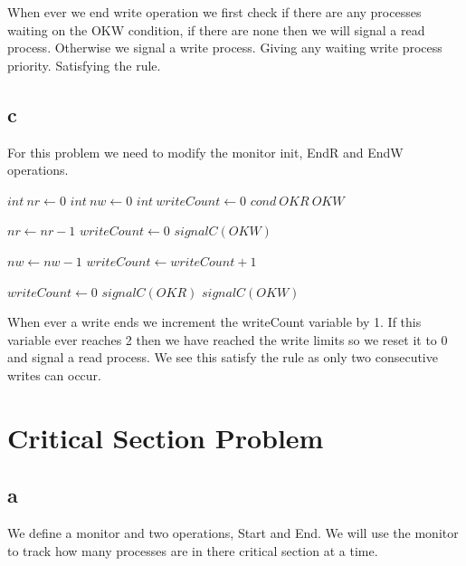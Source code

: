 \documentclass[a4paper, 12pt]{article}
\begin{document}
  		When ever we end write operation we first check if there are any processes waiting on the OKW condition, if there are none then we will signal a read process. Otherwise we signal a write process. Giving any waiting write process priority. Satisfying the rule.
  		
  	\subsection{c}
  		For this problem we need to modify the monitor init, EndR and EndW operations.
  		
		 \begin{algorithm}[H]
  			\begin{algorithmic}[1]
  					\State $int\ nr \gets 0$
  					\State $int\ nw \gets 0$
  					\State $int\ writeCount \gets 0$
  					\State $cond\ OKR\ OKW$
  				\EndProcedure
  				
					\State $nr \gets nr - 1$
					\State $writeCount \gets 0$
						\State $signalC(OKW)$
					\EndIf
				\EndProcedure  				
  				
  					\State $nw \gets nw - 1$
  					\State $writeCount \gets writeCount + 1$
  					
  						\State $writeCount \gets 0$
  						\State $signalC(OKR)$
  					\Else
  						\State $signalC(OKW)$
  					\EndIf
  				\EndProcedure
  			\end{algorithmic}
  		\end{algorithm}
  		
		When ever a write ends we increment the writeCount variable by 1. If this variable ever reaches 2 then we have reached the write limits so we reset it to 0 and signal a read process. We see this satisfy the rule as only two consecutive writes can occur.
  		
  		
  		
	\section{Critical Section Problem}
		\subsection{a}
			We define a monitor and two operations, Start and End. We will use the monitor to track how many processes are in there critical section at a time.	
		
\end{document}

